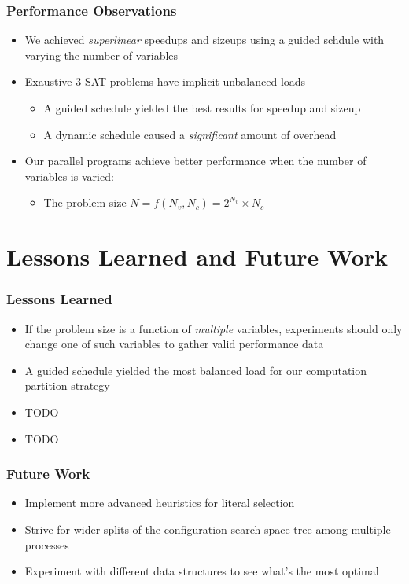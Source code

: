 \documentclass[handout]{beamer}
\begin{document}
\begin{frame}
	\frametitle{Performance Observations}
	\begin{itemize}
		\item We achieved \emph{superlinear} speedups and sizeups using a guided schdule with varying the number of variables
		\item Exaustive 3-SAT problems have implicit unbalanced loads
		\begin{itemize}
			\item A guided schedule yielded the best results for speedup and sizeup
			\item A dynamic schedule caused a \emph{significant} amount of overhead
		\end{itemize}
		\item Our parallel programs achieve better performance when the number of variables is varied:
		\begin{itemize}
			\item The problem size $N = f(N_v, N_c) = 2^{N_v} \times N_c$
		\end{itemize}
	\end{itemize}
\end{frame}

\section{Lessons Learned and Future Work}
\begin{frame}
	\frametitle{Lessons Learned}
	\begin{itemize}
		\item If the problem size is a function of \emph{multiple} variables, experiments should only change one 
		of such variables to gather valid performance data
		\item A guided schedule yielded the most balanced load for our computation partition strategy
		\item TODO
		\item TODO
	\end{itemize}
\end{frame}

\begin{frame}
	\frametitle{Future Work}
	\begin{itemize}
		\item Implement more advanced heuristics for literal selection
		\item Strive for wider splits of the configuration search space tree among multiple processes 
		\item Experiment with different data structures to see what's the most optimal
	\end{itemize}
\end{frame}
\end{document}

